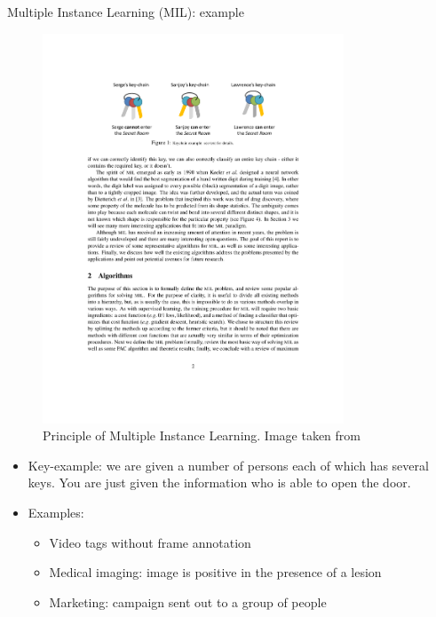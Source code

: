\documentclass[xcolor=pdftex,dvipsnames,table]{beamer}
\begin{document}
\begin{frame}{Multiple Instance Learning (MIL): example}
\begin{figure}[htb]
   \centering
   \includegraphics[width=0.8\textwidth]{../graphics/MIL_example_keys.pdf}
   \caption{Principle of Multiple Instance Learning. Image taken from \cite{Babenko}}
\end{figure}
\begin{itemize}
\item Key-example: we are given a number of persons each of which has several keys. You are just given the information who is able to open the door. 
\item Examples:
\begin{itemize}
   \item Video tags without frame annotation
   \item Medical imaging: image is positive in the presence of a lesion
   \item Marketing: campaign sent out to a group of people
\end{itemize}

\end{itemize}
\end{frame}
\end{document}
